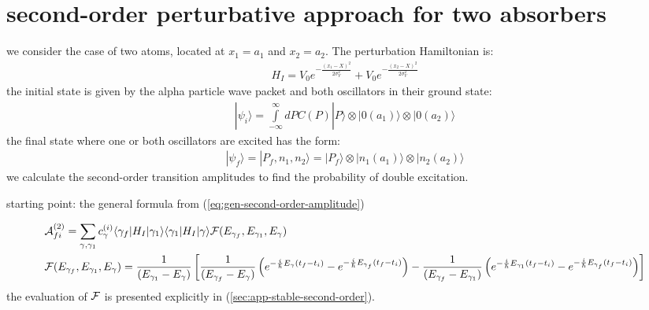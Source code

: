 \newpage
\section{second-order perturbative approach for two absorbers}

we consider the case of two atoms, located at $x_1=a_1$ and $x_2=a_2$. The perturbation Hamiltonian is:
\begin{align}
  H_I = V_0 e^{-\frac{(x_1-X)^2}{2\sigma_V^2}} + V_0 e^{-\frac{(x_2-X)^2}{2\sigma_V^2}}
\end{align}
the initial state is given by the alpha particle wave packet and both oscillators in their ground state:
\begin{align}
  |\psi_i\rangle = \int\limits_{-\infty}^{\infty}dP C(P)|P\rangle\otimes|0(a_1)\rangle\otimes|0(a_2)\rangle
\end{align}
the final state where one or both oscillators are excited has the form:
\begin{align}
  |\psi_f\rangle = |P_f, n_1, n_2\rangle = |P_f\rangle\otimes|n_1(a_1)\rangle\otimes|n_2(a_2)\rangle
\end{align}
we calculate the  second-order transition amplitudes to find the probability of double excitation.

starting point: the general formula from (\ref{eq:gen-second-order-amplitude})

\begin{align}
  &{\cal A}_{fi}^{(2)} =  \sum_{\gamma, \gamma_1} c_{\gamma}^{(i)}\langle\gamma_f|H_I|\gamma_1\rangle \langle\gamma_1|H_I|\gamma\rangle{\cal F}(E_{\gamma_f}, E_{\gamma_1},E_\gamma)\\
  &{\cal F}(E_{\gamma_f}, E_{\gamma_1},E_\gamma)= \frac{1}{(E_{\gamma_1}-E_{\gamma})} \left[ \frac{1}{(E_{\gamma_f}-E_{\gamma})}\left(e^{-\frac{i}{\hbar}E_{\gamma}(t_f-t_i)}-e^{-\frac{i}{\hbar}E_{\gamma_f}(t_f-t_i)}\right)-\frac{1}{(E_{\gamma_f}-E_{\gamma_1})}\left(e^{-\frac{i}{\hbar}E_{\gamma_1}(t_f-t_i)}-e^{-\frac{i}{\hbar}E_{\gamma_f}(t_f-t_i)}\right) \right]
\end{align}\label{eq:osc-two-absorber-o2-general}
the evaluation of ${\cal F}$ is presented explicitly in (\ref{sec:app-stable-second-order}).

